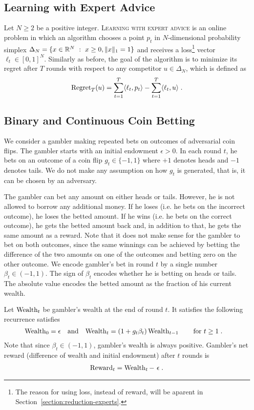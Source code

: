 \subsection{Learning with Expert Advice}

Let $N \ge 2$ be a positive integer. \textsc{Learning with expert advice} is an
online problem in which an algorithm chooses a point $p_t$ in $N$-dimensional
probability simplex $\Delta_N = \{ x \in \mathbb{R}^N ~:~ x \ge 0, \|x\|_1 = 1 \}$ and
receives a loss\footnote{The reason for using loss, instead of reward, will be
aparent in Section~\ref{section:reduction-experts}.} vector $\ell_t \in
[0,1]^N$. Similarly as before, the goal of the algorithm is to minimize its
regret after $T$ rounds with respect to any competitor $u \in \Delta_N$, which
is defined as
$$
\operatorname{Regret}_T(u) = \sum_{t=1}^T \langle \ell_t, p_t \rangle - \sum_{t=1}^T \langle \ell_t, u \rangle \; .
$$

\subsection{Binary and Continuous Coin Betting}

We consider a gambler making repeated bets on outcomes of adversarial coin
flips. The gambler starts with an initial endowment $\epsilon > 0$. In each
round $t$, he bets on an outcome of a coin flip $g_t \in \{-1,1\}$ where $+1$
denotes heads and $-1$ denotes tails. We do not make any assumption on how $g_t$
is generated, that is, it can be chosen by an adversary.

The gambler can bet any amount on either heads or tails. However, he is not
allowed to borrow any additional money. If he loses (i.e. he bets on the
incorrect outcome), he loses the betted amount. If he wins (i.e. he bets on the
correct outcome), he gets the betted amount back and, in addition to that, he
gets the same amount as a reward. Note that it does not make sense for the
gambler to bet on both outcomes, since the same winnings can be achieved by
betting the difference of the two amounts on one of the outcomes and betting
zero on the other outcome. We encode gambler's bet in round $t$ by a single
number $\beta_t \in (-1,1)$. The sign of $\beta_t$ encodes whether he is betting
on heads or tails. The absolute value encodes the betted amount as the fraction
of his current wealth.

Let $\operatorname{Wealth}_t$ be gambler's wealth at the end of round $t$. It satisfies the
following recurrence satisfies
\begin{align}
\label{equation:wealth-recurrence}
\operatorname{Wealth}_0 & = \epsilon &
& \text{and} &
\operatorname{Wealth}_t & = (1 + g_t \beta_t) \operatorname{Wealth}_{t-1} \qquad \text{for $t \ge 1$} \; .
\end{align}
Note that since $\beta_t \in (-1,1)$, gambler's wealth is always positive.
Gambler's net reward (difference of wealth and initial endowment) after $t$
rounds is
\begin{align}
\label{equation:reward-wealth}
\operatorname{Reward}_t = \operatorname{Wealth}_t - \ \epsilon \; .
\end{align}

